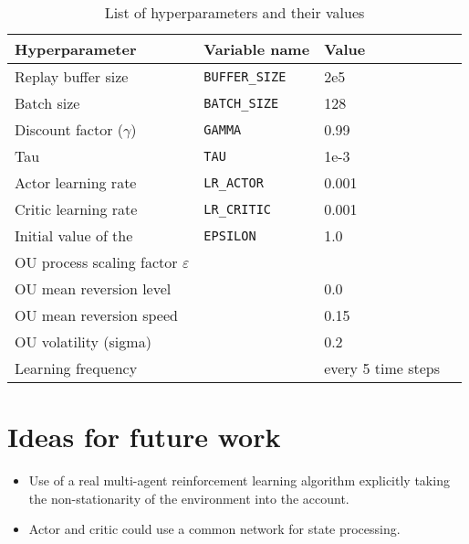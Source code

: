 \documentclass[a4paper,12pt]{amsart}
\begin{document}
\begin{table}
\caption{List of hyperparameters and their values}
\begin{tabular}{|l|l|l|l|}
    \hline
Hyperparameter & Variable name & Value \\ 
    \hline \hline
    Replay buffer size & \texttt{BUFFER\_SIZE} &  2e5 \\ \hline
    Batch size & \texttt{BATCH\_SIZE} &  128  \\  \hline
    Discount factor ($\gamma$) & \texttt{GAMMA} &  0.99 \\ \hline
    Tau & \texttt{TAU} & 1e-3 \\ \hline
    Actor learning rate & \texttt{LR\_ACTOR} & 0.001 \\ \hline
    Critic learning rate & \texttt{LR\_CRITIC} & 0.001 \\ \hline
    Initial value of the & \texttt{EPSILON} & 1.0 \\
    OU process scaling factor $\varepsilon$ && \\ \hline
    OU mean reversion level & & 0.0 \\ \hline
    OU mean reversion speed & & 0.15 \\ \hline
    OU volatility (sigma) & & 0.2 \\ \hline
    Learning frequency & \texttt{} &  every 5 time steps \\ \hline
\end{tabular}
\label{tab:hyperparameters}
\end{table}

\section{Ideas for future work}

\begin{itemize}
    \item Use of a real multi-agent reinforcement learning algorithm explicitly taking the
        non-stationarity of the environment into the account.
    \item Actor and critic could use a common network for state processing. 
\end{itemize}

\nocite{lillicrap2015continuous}
\printbibliography
\end{document}
